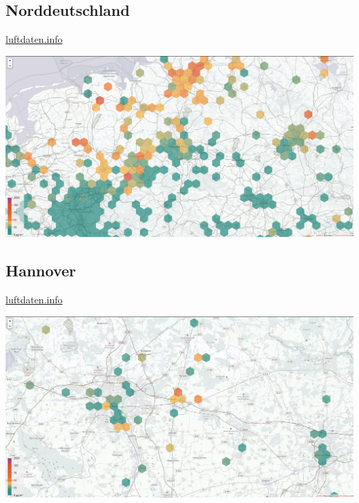 \documentclass[aspectratio=169]{beamer} %
\begin{document}
\subsection{Norddeutschland}
\begin{frame}{\href{http://hannover.maps.luftdaten.info/\#8/52.373/10.005}{luftdaten.info}}
  \begin{center}
    \includegraphics[width=\textwidth]{../screenshots/luftdaten-zoom-d.png}
  \end{center}
\end{frame}
\subsection{Hannover}
\begin{frame}{\href{http://hannover.maps.luftdaten.info/\#10/52.373/10.005}{luftdaten.info}}
  \begin{center}
    \includegraphics[width=\textwidth]{../screenshots/luftdaten-zoom-b.png}
  \end{center}
\end{frame}
\end{document}
